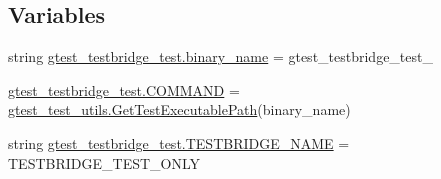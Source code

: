 \subsection*{Variables}
\begin{DoxyCompactItemize}
\item 
string \mbox{\hyperlink{namespacegtest__testbridge__test_a977d1efd7bcefffc40c3180756a22b54}{gtest\+\_\+testbridge\+\_\+test.\+binary\+\_\+name}} = \textquotesingle{}gtest\+\_\+testbridge\+\_\+test\+\_\+\textquotesingle{}
\item 
\mbox{\hyperlink{namespacegtest__testbridge__test_a877e21091a8b1b2c70f8741279592c4a}{gtest\+\_\+testbridge\+\_\+test.\+C\+O\+M\+M\+A\+ND}} = \mbox{\hyperlink{namespacegtest__test__utils_a89ed3717984a80ffbb7a9c92f71b86a2}{gtest\+\_\+test\+\_\+utils.\+Get\+Test\+Executable\+Path}}(binary\+\_\+name)
\item 
string \mbox{\hyperlink{namespacegtest__testbridge__test_a33605c2f318125cd970d016043c05d8f}{gtest\+\_\+testbridge\+\_\+test.\+T\+E\+S\+T\+B\+R\+I\+D\+G\+E\+\_\+\+N\+A\+ME}} = \textquotesingle{}T\+E\+S\+T\+B\+R\+I\+D\+G\+E\+\_\+\+T\+E\+S\+T\+\_\+\+O\+N\+LY\textquotesingle{}
\end{DoxyCompactItemize}
